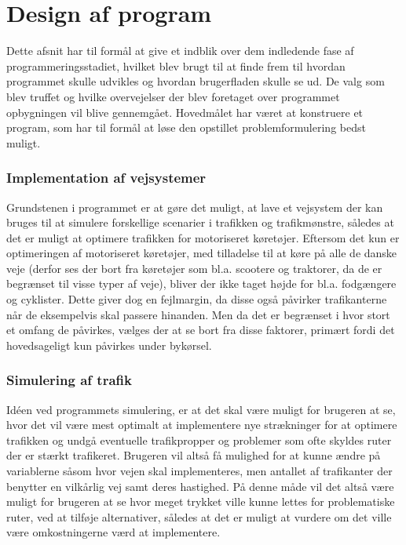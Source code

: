 \chapter{Design af program}
Dette afsnit har til formål at give et indblik over dem indledende fase af programmeringsstadiet, hvilket blev brugt til at finde frem til hvordan programmet skulle udvikles og hvordan brugerfladen skulle se ud. De valg som blev truffet og hvilke overvejelser der blev foretaget over programmet opbygningen vil blive gennemgået. Hovedmålet har været at konstruere et program, som har til formål at løse den opstillet problemformulering bedst muligt. 

\subsection{Implementation af vejsystemer}
Grundstenen i programmet er at gøre det muligt, at lave et vejsystem der kan bruges til at simulere forskellige scenarier i trafikken og trafikmønstre, således at det er muligt at optimere trafikken for motoriseret køretøjer. Eftersom det kun er optimeringen af motoriseret køretøjer, med tilladelse til at køre på alle de danske veje (derfor ses der bort fra køretøjer som bl.a. scootere og traktorer, da de er begrænset til visse typer af veje), bliver der ikke taget højde for bl.a. fodgængere og cyklister. Dette giver dog en fejlmargin, da disse også påvirker trafikanterne når de eksempelvis skal passere hinanden. Men da det er begrænset i hvor stort et omfang de påvirkes, vælges der at se bort fra disse faktorer, primært fordi det hovedsageligt kun påvirkes under bykørsel. 

\subsection{Simulering af trafik}
Idéen ved programmets simulering, er at det skal være muligt for brugeren at se, hvor det vil være mest optimalt at implementere nye strækninger for at optimere trafikken og undgå eventuelle trafikpropper og problemer som ofte skyldes ruter der er stærkt trafikeret. Brugeren vil altså få mulighed for at kunne ændre på variablerne såsom hvor vejen skal implementeres, men antallet af trafikanter der benytter en vilkårlig vej samt deres hastighed. På denne måde vil det altså være muligt for brugeren at se hvor meget trykket ville kunne lettes for problematiske ruter, ved at tilføje alternativer, således at det er muligt at vurdere om det ville være omkostningerne værd at implementere. 

